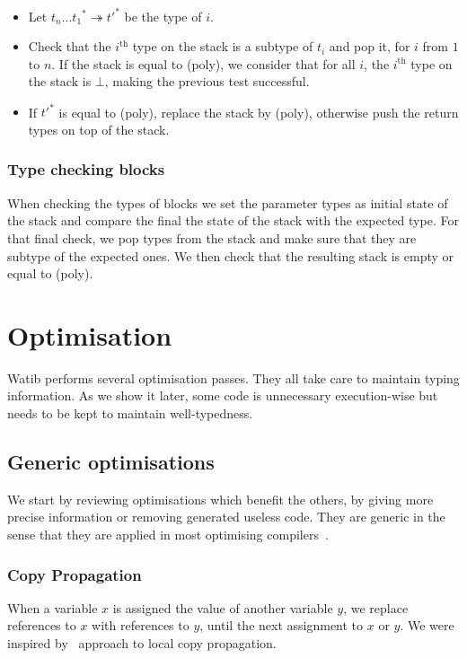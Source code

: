 \documentclass[a4paper,11pt]{article}
\begin{document}
\begin{itemize}
\item Let ${t_n\ldots t_1}^*\twoheadrightarrow{t'}^*$ be the type of $i$.
\item Check that the $i^{\text{th}}$ type on the stack is a subtype of $t_i$ and
  pop it, for $i$ from $1$ to $n$. If the stack is equal to \textsf{(poly)}, we
  consider that for all $i$, the $i^{\text{th}}$ type on the stack is
  $\bot$, making the previous test successful.
\item If ${t'}^*$ is equal to \textsf{(poly)}, replace the stack by
  \textsf{(poly)}, otherwise push the return types on top of the stack.
\end{itemize}

\subsubsection{Type checking blocks}
When checking the types of blocks we set the parameter types as initial state of
the stack and compare the final the state of the stack with the expected type.
For that final check, we pop types from the stack and make sure that they are
subtype of the expected ones. We then check that the resulting stack is empty or
equal to \textsf{(poly)}.

\section{Optimisation}\label{opt}
\textsf{Watib} performs several optimisation passes. They all take care to
maintain typing information. As we show it later, some code is unnecessary
execution-wise but needs to be kept to maintain well-typedness.

\subsection{Generic optimisations}
We start by reviewing optimisations which benefit the others, by giving more
precise information or removing generated useless code. They are generic in the
sense that they are applied in most optimising
compilers~\cite{muchnick1997advanced}.

\subsubsection{Copy Propagation}
When a variable $x$ is assigned the value of another variable $y$, we replace
references to $x$ with references to $y$, until the next assignment to $x$ or
$y$. We were inspired by~\cite[Section~12.5]{muchnick1997advanced} approach to
local copy propagation.
\end{document}

